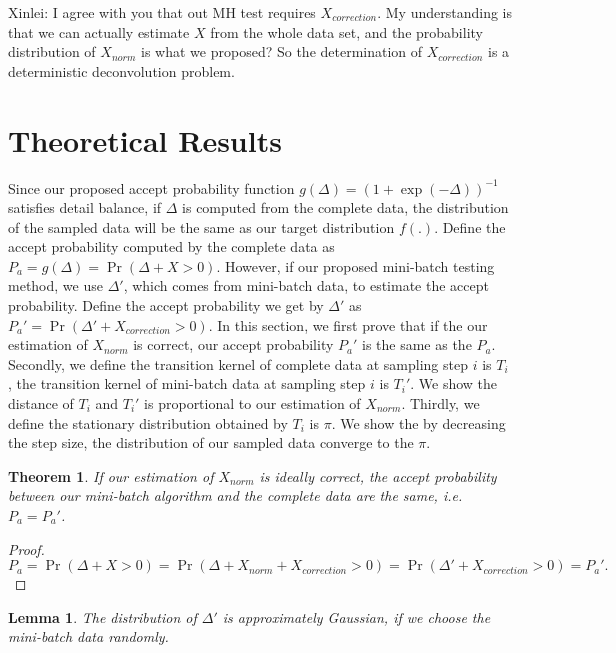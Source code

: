 \documentclass{article}
\newtheorem{lemma}{Lemma}
\newtheorem{theorem}{Theorem}
\begin{document}
{\color{blue} Xinlei: I agree with you that out MH test requires $X_{correction}$. My understanding
is that we can actually estimate $X$ from the whole data set, and the probability distribution of
$X_{norm}$ is what we proposed? So the determination of $X_{correction}$ is a deterministic
deconvolution problem.  }




\section{Theoretical Results}\label{sec:theory}

Since our proposed accept probability function $g(\Delta) = (1+ \exp(-\Delta))^{-1}$ satisfies
detail balance, if $\Delta$ is computed from the complete data, the distribution of the sampled data
will be the same as our target distribution $f(.)$. Define the accept probability computed by the
complete data as $P_a = g(\Delta) = \Pr(\Delta + X > 0)$. However, if our proposed mini-batch
testing method, we use $\Delta'$, which comes from mini-batch data, to estimate the accept
probability. Define the accept probability we get by $\Delta'$ as $P_a' = \Pr(\Delta' +
X_{correction} > 0)$. In this section, we first prove that if the our estimation of $X_{norm}$ is
correct, our accept probability $P_a'$ is the same as the $P_a$. Secondly, we define the transition
kernel of complete data at sampling step $i$ is $T_i$, the transition kernel of mini-batch data at
sampling step $i$ is $T_i'$. We show the distance of $T_i$ and $T_i'$ is proportional to our
estimation of $X_{norm}$. Thirdly, we define the stationary distribution obtained by $T_i$ is $\pi$.
We show the by decreasing the step size, the distribution of our sampled data converge to the $\pi$.

\begin{theorem}
If our estimation of $X_{norm}$ is ideally correct, the accept probability between our mini-batch
algorithm and the complete data are the same, i.e. $P_a = P_a'$.
\end{theorem}

\begin{proof}
\[
P_a = \Pr (\Delta + X > 0) = \Pr (\Delta + X_{norm} + X_{correction} > 0) = \Pr (\Delta' +
X_{correction} > 0) = P_a'.
\]
\end{proof}

\begin{lemma}
The distribution of $\Delta'$ is approximately Gaussian, if we choose the mini-batch data randomly. 
\end{lemma}
\end{document}
